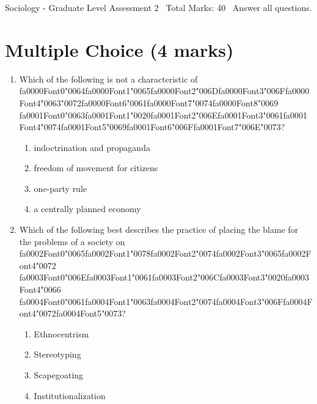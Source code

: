 \documentclass[12pt]{article}
\begin{document}
\begin{center}
Sociology - Graduate Level Assessment 2 \
Total Marks: 40 \
Answer all questions.
\end{center}

\section*{Multiple Choice (4 marks)}
\begin{enumerate}[label=\arabic*.]
\item Which of the following is not a characteristic of {\csname fa0000Font0\endcsname\char"0064}{\csname fa0000Font1\endcsname\char"0065}{\csname fa0000Font2\endcsname\char"006D}{\csname fa0000Font3\endcsname\char"006F}{\csname fa0000Font4\endcsname\char"0063}{\char"0072}{\csname fa0000Font6\endcsname\char"0061}{\csname fa0000Font7\endcsname\char"0074}{\csname fa0000Font8\endcsname\char"0069} {\csname fa0001Font0\endcsname\char"0063}{\csname fa0001Font1\endcsname\char"0020}{\csname fa0001Font2\endcsname\char"006E}{\csname fa0001Font3\endcsname\char"0061}{\csname fa0001Font4\endcsname\char"0074}{\csname fa0001Font5\endcsname\char"0069}{\csname fa0001Font6\endcsname\char"006F}{\csname fa0001Font7\endcsname\char"006E}{\char"0073}?
\begin{enumerate}[label=(\alph*)]
    \item indoctrination and propaganda
    \item freedom of movement for citizens
    \item one-party rule
    \item a centrally planned economy
\end{enumerate}
\item Which of the following best describes the practice of placing the blame for the problems of a society on {\csname fa0002Font0\endcsname\char"0065}{\csname fa0002Font1\endcsname\char"0078}{\csname fa0002Font2\endcsname\char"0074}{\csname fa0002Font3\endcsname\char"0065}{\csname fa0002Font4\endcsname\char"0072} {\csname fa0003Font0\endcsname\char"006E}{\csname fa0003Font1\endcsname\char"0061}{\csname fa0003Font2\endcsname\char"006C}{\csname fa0003Font3\endcsname\char"0020}{\csname fa0003Font4\endcsname\char"0066} {\csname fa0004Font0\endcsname\char"0061}{\csname fa0004Font1\endcsname\char"0063}{\csname fa0004Font2\endcsname\char"0074}{\csname fa0004Font3\endcsname\char"006F}{\csname fa0004Font4\endcsname\char"0072}{\csname fa0004Font5\endcsname\char"0073}?
\begin{enumerate}[label=(\alph*)]
    \item Ethnocentrism
    \item Stereotyping
    \item Scapegoating
    \item Institutionalization
\end{enumerate}
\end{enumerate}
\end{document}
